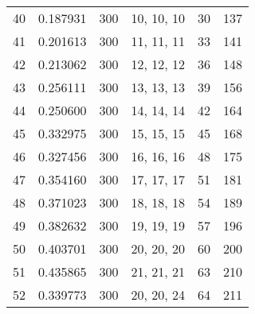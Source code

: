 \begin{tabular}{lrrlrr}
40 &      0.187931 &              300 &     10, 10, 10 &            30 &          137 \\
41 &      0.201613 &              300 &     11, 11, 11 &            33 &          141 \\
42 &      0.213062 &              300 &     12, 12, 12 &            36 &          148 \\
43 &      0.256111 &              300 &     13, 13, 13 &            39 &          156 \\
44 &      0.250600 &              300 &     14, 14, 14 &            42 &          164 \\
45 &      0.332975 &              300 &     15, 15, 15 &            45 &          168 \\
46 &      0.327456 &              300 &     16, 16, 16 &            48 &          175 \\
47 &      0.354160 &              300 &     17, 17, 17 &            51 &          181 \\
48 &      0.371023 &              300 &     18, 18, 18 &            54 &          189 \\
49 &      0.382632 &              300 &     19, 19, 19 &            57 &          196 \\
50 &      0.403701 &              300 &     20, 20, 20 &            60 &          200 \\
51 &      0.435865 &              300 &     21, 21, 21 &            63 &          210 \\
52 &      0.339773 &              300 &     20, 20, 24 &            64 &          211 \\
\bottomrule
\end{tabular}
